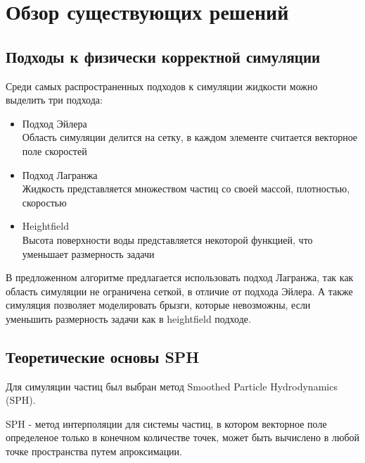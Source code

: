 \chapter{Обзор существующих решений} \label{ch2}


\section{Подходы к физически корректной симуляции} \label{ch2:title-abbr} %


Среди самых распространенных подходов к симуляции жидкости можно выделить три
подхода:
\begin{itemize}
	\item Подход Эйлера\\
	      Область симуляции делится на сетку, в каждом элементе считается векторное
	      поле скоростей
	\item Подход Лагранжа\\
	      Жидкость представляется множеством частиц со своей массой, плотностью,
	      скоростью
	\item Heightfield\\
	      Высота поверхности воды представляется некоторой функцией, что уменьшает
	      размерность задачи
\end{itemize}

В предложенном алгоритме предлагается использовать подход Лагранжа, так как
область симуляции не ограничена сеткой, в отличие от подхода Эйлера. А также
симуляция позволяет моделировать брызги, которые невозможны, если уменьшить
размерность задачи как в heightfield подходе.


\section{Теоретические основы SPH} \label{ch2:sec-abbr} %

Для симуляции частиц был выбран метод Smoothed Particle Hydrodynamics (SPH).

SPH - метод интерполяции для системы частиц, в котором векторное поле
определеное только в конечном количестве точек, может быть вычислено в любой
точке пространства путем апроксимации.

